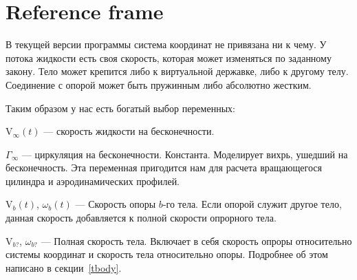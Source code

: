 \documentclass[14pt]{extreport}
\newcommand{\comment}[1]{}
\newcommand{\br}[1]{\boldsymbol{\mathrm{#1}}}
\newenvironment{packed_itemize}{
\begin{itemize}
  \setlength{\itemsep}{1pt}
  \setlength{\parskip}{0pt}
  \setlength{\parsep}{0pt}
}{\end{itemize}}
\begin{document}
\section{Reference frame}
\label{refframe}
В текущей версии программы система координат не привязана ни к чему. У потока жидкости есть своя скорость, которая может изменяться по заданному закону. Тело может крепится либо к виртуальной державке, либо к другому телу. Соединение с опорой может быть пружинным либо абсолютно жестким.

Таким образом у нас есть богатый выбор переменных:
\begin{packed_itemize}
\item $\br V_\infty(t)$ --- скорость жидкости на бесконечности.
\item $\Gamma_{\infty}$ --- циркуляция на бесконечности. Константа. Моделирует вихрь, ушедший на бесконечность. Эта переменная пригодится нам для расчета вращающегося цилиндра и аэродинамических профилей.
\item $\br V_b(t)$, $\omega_b(t)$ --- Скорость опоры $b$-го тела. Если опорой служит другое тело, данная скорость добавляется к полной скорости опрорного тела.
\item $\br V_{b?}$, $\omega_{b?}$ --- Полная скорость тела. Включает в себя скорость опроры относительно системы координат и скорость тела относительно опоры. Подробнее об этом написано в секции~\ref{tbody}.
\end{packed_itemize}

\comment{Система координат используется правая. Это значит, если вы рисуете ось $Ox$ слева на право, а ось $Oy$ снизу вверх, то положительным направлением вращения будет являться вращение против часовой стрелки.

Помимо основной системы координат, имеется также система координат тела: $Ox_b y_b$. С основной системой координат она связана выражением
\begin{equation*}
\br r = \br r_c + \left(\begin{array}{cc}
\cos(\alpha) & -\sin(\alpha) \\
sin(\alpha) & \cos(\alpha) \end{array}\right) \cdot \br r_b
\end{equation*}
Центр поворота жестко связан с центром системы $Ox_b y_b$. Это нужно учитывать при загрузке тела. Система осчета тела используется только при загрузке. Везде внутри комплекса координаты тела записываются в основной системе. 
\begin{center}\end{center}
}
\end{document}
